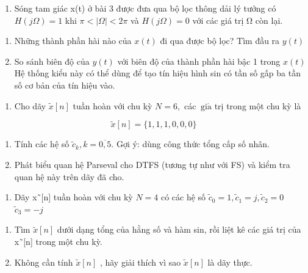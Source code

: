 \documentclass[
  10
]{article}
\providecommand{\tightlist}{%
  \setlength{\itemsep}{0pt}\setlength{\parskip}{0pt}}
\begin{document}
\begin{enumerate}
\def\labelenumi{\arabic{enumi}.}
\setcounter{enumi}{4}
\tightlist
\item
  Sóng tam giác x(t) ở bài 3 được đưa qua bộ lọc thông dải lý tưởng có
  \(H ( j \Omega ) = 1\) khi \(\pi < | \Omega | < 2 \pi\) và
  \(H ( j \Omega ) = 0\) với các giá trị Ω còn lại.
\end{enumerate}

\begin{enumerate}
\def\labelenumi{(\alph{enumi})}
\item
  Những thành phần hài nào của \(x ( t )\) đi qua được bộ lọc? Tìm đầu
  ra \(y ( t )\)
\item
  So sánh biên độ của \(y ( t )\) với biên độ của thành phần hài bậc 1
  trong \(x ( t )\) Hệ thống kiểu này có thể dùng để tạo tín hiệu hình
  sin có tần số gấp ba tần số cơ bản của tín hiệu vào.
\end{enumerate}

\begin{enumerate}
\def\labelenumi{\arabic{enumi}.}
\setcounter{enumi}{5}
\tightlist
\item
  Cho dãy \({ \tilde { x } } [ n ]\) tuần hoàn với chu kỳ \(N = 6 ,\)
  các \(\mathrm { \ g i \acute { a } }\) trị trong một chu kỳ là
\end{enumerate}

\[
\tilde {x} [ n ] = \{1, 1, 1, 0, 0, 0 \}
\]

\begin{enumerate}
\def\labelenumi{(\alph{enumi})}
\item
  Tính các hệ số
  \(\tilde { c } _ { k } , k = \overline { { 0 , 5 } } .\) Gợi ý: dùng
  công thức tổng cấp số nhân.
\item
  Phát biểu quan hệ Parseval cho DTFS (tương tự như với FS) và kiểm tra
  quan hệ này trên dãy đã cho.
\end{enumerate}

\begin{enumerate}
\def\labelenumi{\arabic{enumi}.}
\setcounter{enumi}{6}
\tightlist
\item
  Dãy x˜{[}n{]} tuần hoàn với chu kỳ \(N = 4\) có các hệ số
  \(\tilde { c } _ { 0 } = 1 , \tilde { c } _ { 1 } = j , \tilde { c } _ { 2 } = 0\)
  \({ \tilde { c } } _ { 3 } = - j\)
\end{enumerate}

\begin{enumerate}
\def\labelenumi{(\alph{enumi})}
\item
  Tìm \({ \tilde { x } } [ n ]\) dưới dạng tổng của hằng số và hàm sin,
  rồi liệt kê các giá trị của x˜{[}n{]} trong một chu kỳ.
\item
  Không cần tính \({ \tilde { x } } [ n ]\) , hãy giải thích vì sao
  \({ \tilde { x } } [ n ]\) là dãy thực.
\end{enumerate}
\end{document}

